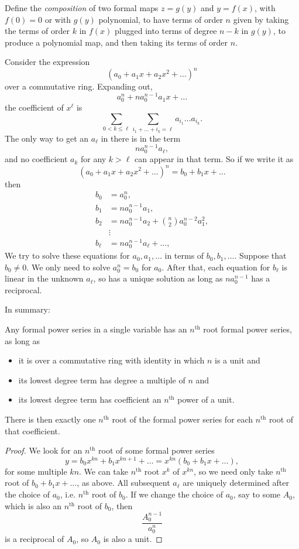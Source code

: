 Define the \emph{composition} of two formal maps \(z=g(y)\) and \(y=f(x)\), with \(f(0)=0\) or with \(g(y)\) polynomial, to have terms of order \(n\) given by taking the terms of order \(k\) in \(f(x)\) plugged into terms of degree \(n-k\) in \(g(y)\), to produce a polynomial map, and then taking its terms of order \(n\).
\begin{example}
Consider the expression
\[
(a_0+a_1x+a_2x^2+\dots)^n
\]
over a commutative ring.
Expanding out, 
\[
a_0^n+na_0^{n-1}a_1x+\dots
\]
the coefficient of \(x^{\ell}\) is
\[
\sum_{0<k\le\ell}
\sum_{i_1+\dots+i_k=\ell} a_{i_1}\dots a_{i_k}.
\]
The only way to get an \(a_{\ell}\) in there is in the term
\[
na_0^{n-1} a_{\ell},
\]
and no coefficient \(a_k\) for any \(k>\ell\) can appear in that term.
So if we write it as
\[
(a_0+a_1x+a_2x^2+\dots)^n=b_0+b_1x+\dots
\]
then
\begin{align*}
b_0&=a_0^n,\\
b_1&=na_0^{n-1}a_1,\\
b_2&=na_0^{n-1}a_2+\binom{n}{2}a_0^{n-2}a_1^2,\\
&\vdots\\
b_{\ell}&=na_0^{n-1}a_{\ell}+\dots,
\end{align*}
We try to solve these equations for \(a_0,a_1,\dots\) in terms of \(b_0,b_1,\dots\).
Suppose that \(b_0\ne 0\).
We only need to solve \(a_0^n=b_0\) for \(a_0\).
After that, each equation for \(b_{\ell}\) is linear in the unknown \(a_{\ell}\), so has a unique solution as long as \(na_0^{n-1}\) has a reciprocal.
\end{example}
In summary:
\begin{theorem}\label{thm:n.root.fps}
Any formal power series in a single variable has an \(n^{\text{th}}\) root formal power series, as long as 
\begin{itemize}
\item
it is over a commutative ring with identity in which \(n\) is a unit and
\item
its lowest degree term has degree a multiple of \(n\) and
\item
its lowest degree term has coefficient an \(n^{\text{th}}\) power of a unit.
\end{itemize}
There is then exactly one \(n^{\text{th}}\) root of the formal power series for each \(n^{\text{th}}\) root of that coefficient.
\end{theorem}
\begin{proof}
We look for an \(n^{\text{th}}\) root of some formal power series
\[
y=b_0x^{kn}+b_1x^{kn+1}+\dots=x^{kn}(b_0+b_1x+\dots),
\]
for some multiple \(kn\).
We can take \(n^{\text{th}}\) root \(x^k\) of \(x^{kn}\), so we need only take \(n^{\text{th}}\) root of \(b_0+b_1x+\dots\), as above.
All subsequent \(a_{\ell}\) are uniquely determined after the choice of \(a_0\), i.e. \(n^{\text{th}}\) root of \(b_0\). 
If we change the choice of \(a_0\), say to some \(A_0\), which is also an \(n^{\text{th}}\) root of \(b_0\), then 
\[
\frac{A_0^{n-1}}{a_0^n}
\]
is a reciprocal of \(A_0\), so \(A_0\) is also a unit.
\end{proof}
